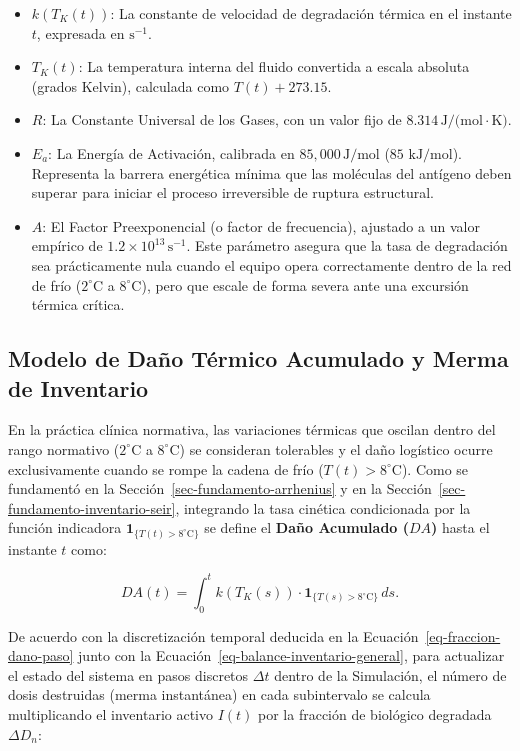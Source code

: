 \documentclass[
  spanish,
  us-letterpaper,
]{scrreprt}
\providecommand{\tightlist}{%
  \setlength{\itemsep}{0pt}\setlength{\parskip}{0pt}}
\numberwithin{equation}{section}
\theoremstyle{plain}
\theoremstyle{plain}
\theoremstyle{plain}
\theoremstyle{definition}
\theoremstyle{remark}
\begin{document}
\begin{itemize}
\tightlist
\item
  \textbf{\(k(T_K(t))\)}: La constante de velocidad de degradación
  térmica en el instante \(t\), expresada en \(\text{s}^{-1}\).
\item
  \textbf{\(T_K(t)\)}: La temperatura interna del fluido convertida a
  escala absoluta (grados Kelvin), calculada como \(T(t) + 273.15\).
\item
  \textbf{\(R\)}: La Constante Universal de los Gases, con un valor fijo
  de \(8.314 \, \text{J/(mol} \cdot \text{K)}\).
\item
  \textbf{\(E_a\)}: La Energía de Activación, calibrada en
  \textbf{\(85,000 \, \text{J/mol}\)} (\(85 \text{ kJ/mol}\)).
  Representa la barrera energética mínima que las moléculas del antígeno
  deben superar para iniciar el proceso irreversible de ruptura
  estructural.
\item
  \textbf{\(A\)}: El Factor Preexponencial (o factor de frecuencia),
  ajustado a un valor empírico de
  \textbf{\(1.2 \times 10^{13} \, \text{s}^{-1}\)}. Este parámetro
  asegura que la tasa de degradación sea prácticamente nula cuando el
  equipo opera correctamente dentro de la red de frío
  (\(2^\circ\text{C}\) a \(8^\circ\text{C}\)), pero que escale de forma
  severa ante una excursión térmica crítica.
\end{itemize}

\subsection{Modelo de Daño Térmico Acumulado y Merma de
Inventario}\label{modelo-de-dauxf1o-tuxe9rmico-acumulado-y-merma-de-inventario}

En la práctica clínica normativa, las variaciones térmicas que oscilan
dentro del rango normativo (\(2^\circ\text{C}\) a \(8^\circ\text{C}\))
se consideran tolerables y el daño logístico ocurre exclusivamente
cuando se rompe la cadena de frío (\(T(t) > 8^\circ\text{C}\)). Como se
fundamentó en la Sección~\ref{sec-fundamento-arrhenius} y en la
Sección~\ref{sec-fundamento-inventario-seir}, integrando la tasa
cinética condicionada por la función indicadora
\(\mathbf{1}_{\{T(t) > 8^\circ\text{C}\}}\) se define el \textbf{Daño
Acumulado (\(DA\))} hasta el instante \(t\) como:

\[
DA(t) = \int_{0}^{t} k(T_K(s)) \cdot \mathbf{1}_{\{T(s) > 8^\circ\text{C}\}} \, ds.
\]

De acuerdo con la discretización temporal deducida en la
Ecuación~\ref{eq-fraccion-dano-paso} junto con la
Ecuación~\ref{eq-balance-inventario-general}, para actualizar el estado
del sistema en pasos discretos \(\Delta t\) dentro de la Simulación, el
número de dosis destruidas (merma instantánea) en cada subintervalo se
calcula multiplicando el inventario activo \(I(t)\) por la fracción de
biológico degradada \(\Delta D_n\):
\end{document}

